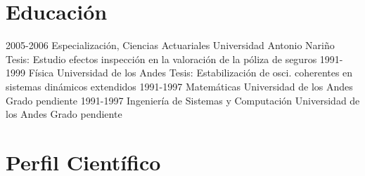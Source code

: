 \section{Educación}
\begin{entrylist}
  \entry
    {2005-2006}
    {Especialización, Ciencias Actuariales}
    {Universidad Antonio Nariño}
    {Tesis: Estudio efectos inspección en la valoración de la póliza de seguros}
  \entry
    {1991-1999}
    {Física}
    {Universidad de los Andes}
    {Tesis: Estabilización de osci. coherentes en sistemas dinámicos extendidos}
   \entry
    {1991-1997}
    {Matemáticas}
    {Universidad de los Andes}
    {Grado pendiente}
  \entry
    {1991-1997}
    {Ingeniería de Sistemas y Computación}
    {Universidad de los Andes}
    {Grado pendiente}
\end{entrylist}

\section{Perfil Científico}
